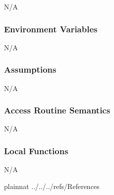 \documentclass[12pt, titlepage]{article}
\begin{document}
N/A

\subsubsection{Environment Variables}

N/A

\subsubsection{Assumptions}

N/A

\subsubsection{Access Routine Semantics}

N/A

\subsubsection{Local Functions}

N/A

\newpage

 {plainnat}
 {../../../refs/References}

\newpage
\end{document}
